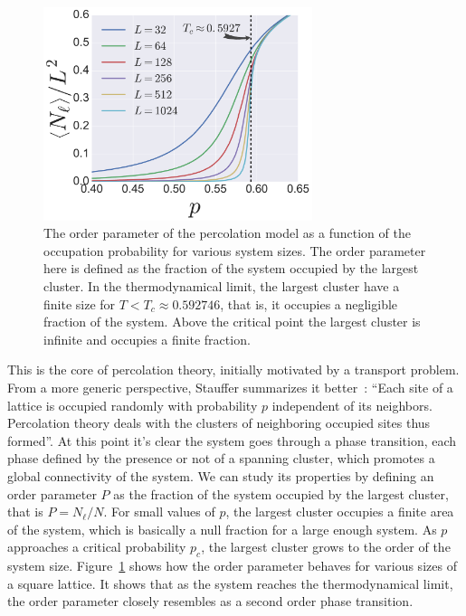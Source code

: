 \begin{figure}[h]
\begin{center}
    \includegraphics[width=0.7\textwidth]{chapters/ch2-crit/figs/isoperco2}
\end{center}
\caption{The order parameter of the percolation model as a function of the
    occupation probability for various system sizes. The order parameter here
    is defined as the fraction of the system occupied by the largest cluster.
    In the thermodynamical limit, the largest cluster have a finite size for
    $T<T_c\approx 0.592746$, that is, it occupies a negligible fraction of the
    system. Above the critical point the largest cluster is infinite and occupies
    a finite fraction.}
\label{fig:isoperco2}
\end{figure}

This is the core of percolation theory, initially motivated by a transport
problem. From a more generic perspective, Stauffer summarizes it
better~\cite{Stauffer1994}: ``Each site of a lattice is occupied randomly with
probability $p$ independent of its neighbors. Percolation theory deals with the
clusters of neighboring occupied sites thus formed''. At this point it's clear
the system goes through a phase transition, each phase defined by the presence
or not of a spanning cluster, which promotes a global connectivity of the
system. We can study its properties by defining an order parameter $P$ as the
fraction of the system occupied by the largest cluster, that is $P=N_\ell/N$.
For small values of $p$, the largest cluster occupies a finite area of the
system, which is basically a null fraction for a large enough system. As $p$
approaches a critical probability $p_c$, the largest cluster grows to the order
of the system size. Figure~\ref{fig:isoperco2} shows how the order parameter
behaves for various sizes of a square lattice. It shows that as the system
reaches the thermodynamical limit, the order parameter closely resembles as a
second order phase transition.

